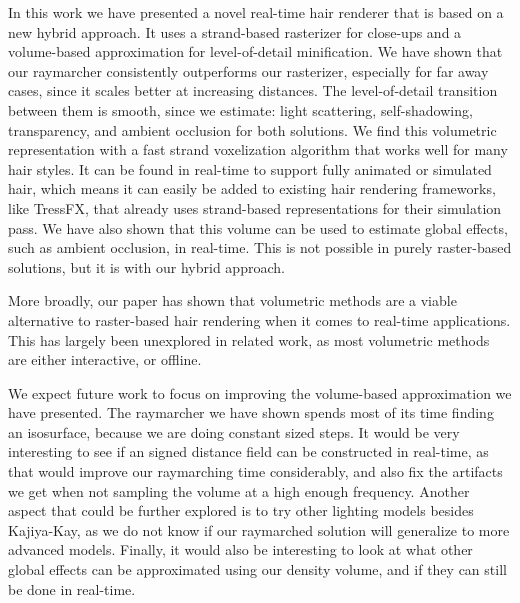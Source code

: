 \documentclass{egpubl}
\begin{document}
In this work we have presented a novel real-time hair renderer that is based on a new hybrid approach. It uses a strand-based rasterizer for close-ups and a volume-based approximation for level-of-detail minification. We have shown that our raymarcher consistently outperforms our rasterizer, especially for far away cases, since it scales better at increasing distances. The level-of-detail transition between them is smooth, since we estimate: light scattering, self-shadowing, transparency, and ambient occlusion for both solutions. We find this volumetric representation with a fast strand voxelization algorithm that works well for many hair styles. It can be found in real-time to support fully animated or simulated hair, which means it can easily be added to existing hair rendering frameworks, like TressFX, that already uses strand-based representations for their simulation pass. We have also shown that this volume can be used to estimate global effects, such as ambient occlusion, in real-time. This is not possible in purely raster-based solutions, but it is with our hybrid approach.


More broadly, our paper has shown that volumetric methods are a viable alternative to raster-based hair rendering when it comes to real-time applications. This has largely been unexplored in related work, as most volumetric methods are either interactive, or offline.


We expect future work to focus on improving the volume-based approximation we have presented. The raymarcher we have shown spends most of its time finding an isosurface, because we are doing constant sized steps. It would be very interesting to see if an signed distance field can be constructed in real-time, as that would improve our raymarching time considerably, and also fix the artifacts we get when not sampling the volume at a high enough frequency. Another aspect that could be further explored is to try other lighting models besides Kajiya-Kay, as we do not know if our raymarched solution will generalize to more advanced models. Finally, it would also be interesting to look at what other global effects can be approximated using our density volume, and if they can still be done in real-time.
\end{document}
